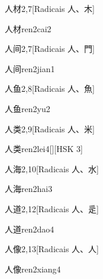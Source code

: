 \begin{entry}{人材}{2,7}[Radicais ⼈、⽊]
  \begin{phonetics}{人材}{ren2cai2}
  \end{phonetics}
\end{entry}

\begin{entry}{人间}{2,7}[Radicais ⼈、⾨]
  \begin{phonetics}{人间}{ren2jian1}
  \end{phonetics}
\end{entry}

\begin{entry}{人鱼}{2,8}[Radicais ⼈、⿂]
  \begin{phonetics}{人鱼}{ren2yu2}
  \end{phonetics}
\end{entry}

\begin{entry}{人类}{2,9}[Radicais ⼈、⽶]
  \begin{phonetics}{人类}{ren2lei4}[][HSK 3]
  \end{phonetics}
\end{entry}

\begin{entry}{人海}{2,10}[Radicais ⼈、⽔]
  \begin{phonetics}{人海}{ren2hai3}
  \end{phonetics}
\end{entry}

\begin{entry}{人道}{2,12}[Radicais ⼈、⾡]
  \begin{phonetics}{人道}{ren2dao4}
  \end{phonetics}
\end{entry}

\begin{entry}{人像}{2,13}[Radicais ⼈、⼈]
  \begin{phonetics}{人像}{ren2xiang4}
  \end{phonetics}
\end{entry}

